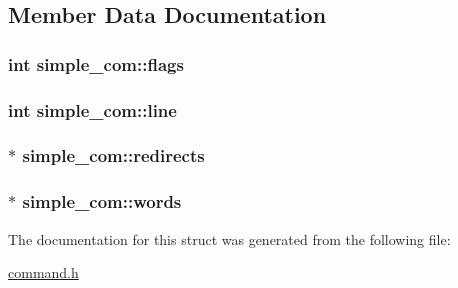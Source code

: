 \subsection{Member Data Documentation}
\subsubsection[{\texorpdfstring{flags}{flags}}]{\setlength{\rightskip}{0pt plus 5cm}int simple\+\_\+com\+::flags}\hypertarget{structsimple__com_a3681da2bf1196015719c7c529a96bafe}{}\label{structsimple__com_a3681da2bf1196015719c7c529a96bafe}
\subsubsection[{\texorpdfstring{line}{line}}]{\setlength{\rightskip}{0pt plus 5cm}int simple\+\_\+com\+::line}\hypertarget{structsimple__com_a837f4e2e2eb00604e2eab7a78d32b089}{}\label{structsimple__com_a837f4e2e2eb00604e2eab7a78d32b089}
\subsubsection[{\texorpdfstring{redirects}{redirects}}]{$\ast$ simple\+\_\+com\+::redirects}\hypertarget{structsimple__com_a8a9c45afa462969d01399d063320bd08}{}\label{structsimple__com_a8a9c45afa462969d01399d063320bd08}
\subsubsection[{\texorpdfstring{words}{words}}]{$\ast$ simple\+\_\+com\+::words}\hypertarget{structsimple__com_ae7a7f329e99d6e622ca9a8daef38c155}{}\label{structsimple__com_ae7a7f329e99d6e622ca9a8daef38c155}


The documentation for this struct was generated from the following file\+:\begin{DoxyCompactItemize}
\item 
\hyperlink{command_8h}{command.\+h}\end{DoxyCompactItemize}
